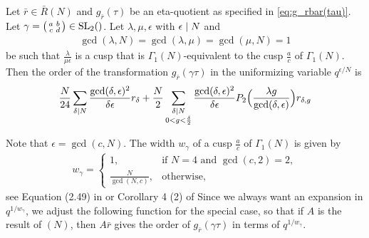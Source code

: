 \documentclass{article}
\begin{document}
\begin{Theorem}
  \cite[Thm~4]{Robins:GeneralizedDedekindEtaProducts:1994}
  Let $\bar{r}\in \bar{R}(N)$ and $g_{\bar{r}}(\tau)$ be an
  eta-quotient as specified in \eqref{eq:g_rbar(tau)}.
  Let
  $\gamma=\left(\begin{smallmatrix}a&b\\c&d\end{smallmatrix}\right)\in\SL2Z$.
  Let
  $\lambda,\mu,\epsilon$ with $\epsilon \mid N$ and
  \begin{gather}
    \gcd(\lambda,N)=\gcd(\lambda,\mu)=\gcd(\mu,N)=1
  \end{gather}
  be such that
  $\frac{\lambda}{\mu\epsilon}$ is a cusp that is
  $\Gamma_1(N)$-equivalent to the cusp $\frac{a}{c}$ of $\Gamma_1(N)$.
  Then the order of the transformation $g_{\bar{r}}(\gamma\tau)$ in
  the uniformizing variable $q^{\epsilon/N}$ is
  \begin{gather}
    \frac{N}{24}  \sum_{\delta \mid N}
    \frac{\gcd(\delta,\epsilon)^2}{\delta\epsilon} r_\delta
    +
    \frac{N}{2}  \sum_{\substack{\delta \mid N\\0 < g < \frac{\delta}{2}}}
    \frac{\gcd(\delta,\epsilon)^2}{\delta\epsilon}
    P_2\Bigl(\frac{\lambda g}{\gcd(\delta,\epsilon)}\Bigr)r_{\delta,g}
    \label{eq:order-rbar-non-adjusted}
  \end{gather}
\end{Theorem}

Note that $\epsilon = \gcd(c, N)$.
%
The width $w_\gamma$ of a cusp $\frac{a}{c}$ of $\Gamma_1(N)$ is given
by
\begin{gather}
  w_\gamma
  =
  \begin{cases}
    1,                   & \text{if $N=4$ and $\gcd(c,2)=2$},\\
    \frac{N}{\gcd(N,c)}, & \text{otherwise},
  \end{cases}
  \label{eq:width1}
\end{gather}
see Equation (2.49) in
\cite{Chen+Du+Zhao:FindingModularFunctionsRamanujan:2019} or Corollary
4 (2) of \cite{Cho+Koo+Park:ArithmeticRamanujanGoellnitzGordon:2009}
%
Since we always want an expansion in
$q^{1/w_\gamma}$, we adjust the following function for the special
case, so that if $A$ is the result of $(N)$, then
$A \bar{r}$ gives the order of $g_{\bar{r}}(\gamma\tau)$ in terms of
$q^{1/w_\gamma}$.
\end{document}
